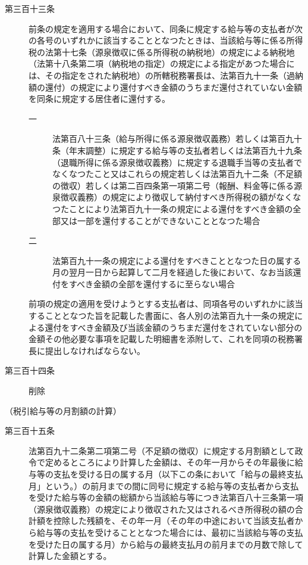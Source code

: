 \documentclass[twocolumn,a4j,10pt]{ltjtarticle}
\begin{document}
\begin{description}
\item[第三百十三条]前条の規定を適用する場合において、同条に規定する給与等の支払者が次の各号のいずれかに該当することとなつたときは、当該給与等に係る所得税の法第十七条（源泉徴収に係る所得税の納税地）の規定による納税地（法第十八条第二項（納税地の指定）の規定による指定があつた場合には、その指定をされた納税地）の所轄税務署長は、法第百九十一条（過納額の還付）の規定により還付すべき金額のうちまだ還付されていない金額を同条に規定する居住者に還付する。
\begin{description}
\item[一]法第百八十三条（給与所得に係る源泉徴収義務）若しくは第百九十条（年末調整）に規定する給与等の支払者若しくは法第百九十九条（退職所得に係る源泉徴収義務）に規定する退職手当等の支払者でなくなつたこと又はこれらの規定若しくは法第百九十二条（不足額の徴収）若しくは第二百四条第一項第二号（報酬、料金等に係る源泉徴収義務）の規定により徴収して納付すべき所得税の額がなくなつたことにより法第百九十一条の規定による還付をすべき金額の全部又は一部を還付することができないこととなつた場合
\item[二]法第百九十一条の規定による還付をすべきこととなつた日の属する月の翌月一日から起算して二月を経過した後において、なお当該還付をすべき金額の全部を還付するに至らない場合
\end{description}
\item[]前項の規定の適用を受けようとする支払者は、同項各号のいずれかに該当することとなつた旨を記載した書面に、各人別の法第百九十一条の規定による還付をすべき金額及び当該金額のうちまだ還付をされていない部分の金額その他必要な事項を記載した明細書を添附して、これを同項の税務署長に提出しなければならない。
\end{description}
\begin{description}
\item[第三百十四条]削除
\end{description}
\noindent\hspace{10pt}（税引給与等の月割額の計算）
\begin{description}
\item[第三百十五条]法第百九十二条第二項第二号（不足額の徴収）に規定する月割額として政令で定めるところにより計算した金額は、その年一月からその年最後に給与等の支払を受ける日の属する月（以下この条において「給与の最終支払月」という。）の前月までの間に同号に規定する給与等の支払者から支払を受けた給与等の金額の総額から当該給与等につき法第百八十三条第一項（源泉徴収義務）の規定により徴収された又はされるべき所得税の額の合計額を控除した残額を、その年一月（その年の中途において当該支払者から給与等の支払を受けることとなつた場合には、最初に当該給与等の支払を受けた日の属する月）から給与の最終支払月の前月までの月数で除して計算した金額とする。
\end{description}
\end{document}
